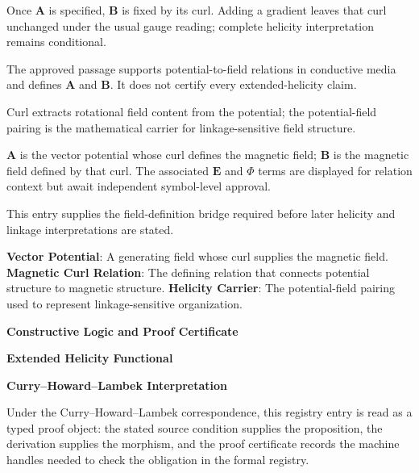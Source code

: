 Once \(\mathbf{A}\) is specified, \(\mathbf{B}\) is fixed by its curl. Adding a gradient leaves that curl unchanged under the usual gauge reading; complete helicity interpretation remains conditional.


The approved passage supports potential-to-field relations in conductive media and defines \(\mathbf{A}\) and \(\mathbf{B}\). It does not certify every extended-helicity claim.


Curl extracts rotational field content from the potential; the potential-field pairing is the mathematical carrier for linkage-sensitive field structure.


\(\mathbf{A}\) is the vector potential whose curl defines the magnetic field; \(\mathbf{B}\) is the magnetic field defined by that curl. The associated \(\mathbf{E}\) and \(\Phi\) terms are displayed for relation context but await independent symbol-level approval.


This entry supplies the field-definition bridge required before later helicity and linkage interpretations are stated.


\noindent \textbf{Vector Potential}: A generating field whose curl supplies the magnetic field. \enspace\textbullet\enspace \textbf{Magnetic Curl Relation}: The defining relation that connects potential structure to magnetic structure. \enspace\textbullet\enspace \textbf{Helicity Carrier}: The potential-field pairing used to represent linkage-sensitive organization.\par

\endgroup

\ifTZPDarkEdition
{}
\fi

\clearpage
\begingroup\tzpsupportsetup
\noindent\textbf{\fontsize{10.8pt}{12.8pt}\selectfont [ID 0368] Constructive Logic and Proof Certificate}\par
\noindent\textbf{\fontsize{10pt}{12pt}\selectfont Extended Helicity Functional}\par
\vspace{0.45em}
\begingroup
\footnotesize
\setlength{\parskip}{0.22em}
\setlength{\parindent}{0pt}
\noindent\textbf{Curry--Howard--Lambek Interpretation}\par
Under the Curry--Howard--Lambek correspondence, this registry entry is read as a typed proof
object: the stated source condition supplies the proposition, the derivation supplies the
morphism, and the proof certificate records the machine handles needed to check the obligation
in the formal registry.

